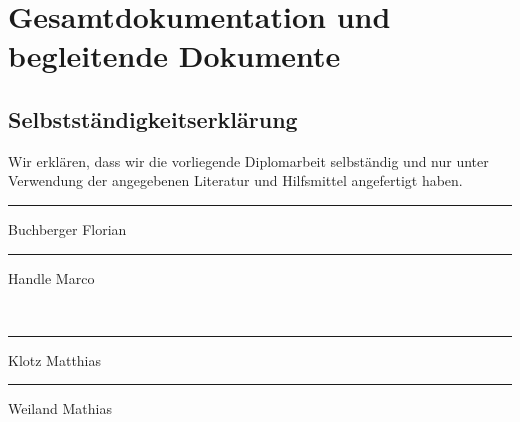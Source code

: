 \chapter[Gesamtdokumentation]{Gesamtdokumentation und begleitende Dokumente}

\section{Selbstständigkeitserklärung}

Wir erklären, dass wir die vorliegende Diplomarbeit selbständig und nur unter Verwendung der angegebenen Literatur und Hilfsmittel angefertigt haben.
\\[5cm]
\parbox{5cm}{\centering\hrule\medskip Buchberger Florian}
\vspace{2cm}
\hfill
\parbox{5cm}{\centering\hrule\medskip Handle Marco}
\vspace{2cm}
\\
\parbox{5cm}{\centering\hrule\medskip Klotz Matthias}
\vspace{2cm}
\hfill
\parbox{5cm}{\centering\hrule\medskip Weiland Mathias}
\vspace{2cm}
